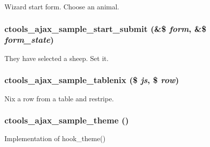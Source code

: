 \label{ctools__ajax__sample_8module_a4a7fe81f89749aa7000d838dc1b1cb25}
Wizard start form. Choose an animal. \hypertarget{ctools__ajax__sample_8module_ae756b86e56bb8ece58fd9d63db0c4ea0}{
\subsubsection[{ctools\_\-ajax\_\-sample\_\-start\_\-submit}]{\setlength{\rightskip}{0pt plus 5cm}ctools\_\-ajax\_\-sample\_\-start\_\-submit (\&\$ {\em form}, \/  \&\$ {\em form\_\-state})}}
\label{ctools__ajax__sample_8module_ae756b86e56bb8ece58fd9d63db0c4ea0}
They have selected a sheep. Set it. \hypertarget{ctools__ajax__sample_8module_a003fef8156e599759a793be39e6a38a7}{
\subsubsection[{ctools\_\-ajax\_\-sample\_\-tablenix}]{\setlength{\rightskip}{0pt plus 5cm}ctools\_\-ajax\_\-sample\_\-tablenix (\$ {\em js}, \/  \$ {\em row})}}
\label{ctools__ajax__sample_8module_a003fef8156e599759a793be39e6a38a7}
Nix a row from a table and restripe. \hypertarget{ctools__ajax__sample_8module_a3b2a2efa6cddf4bdd87af59fe18d9a94}{
\subsubsection[{ctools\_\-ajax\_\-sample\_\-theme}]{\setlength{\rightskip}{0pt plus 5cm}ctools\_\-ajax\_\-sample\_\-theme ()}}
\label{ctools__ajax__sample_8module_a3b2a2efa6cddf4bdd87af59fe18d9a94}
Implementation of hook\_\-theme()

